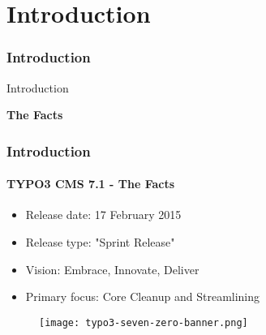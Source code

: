 %

\section{Introduction}
\begin{frame}[fragile]
	\frametitle{Introduction}

	\begin{center}\huge{Introduction}\end{center}
	\begin{center}\huge{\color{typo3darkgrey}\textbf{The Facts}}\end{center}

\end{frame}


\begin{frame}[fragile]
	\frametitle{Introduction}
	\framesubtitle{TYPO3 CMS 7.1 - The Facts}

	\begin{itemize}
		\item Release date: 17 February 2015
		\item Release type: "Sprint Release"
		\item Vision: Embrace, Innovate, Deliver
		\item Primary focus: Core Cleanup and Streamlining
	\end{itemize}

	\begin{figure}
		\texttt{[image: typo3-seven-zero-banner.png]}
	\end{figure}

\end{frame}

